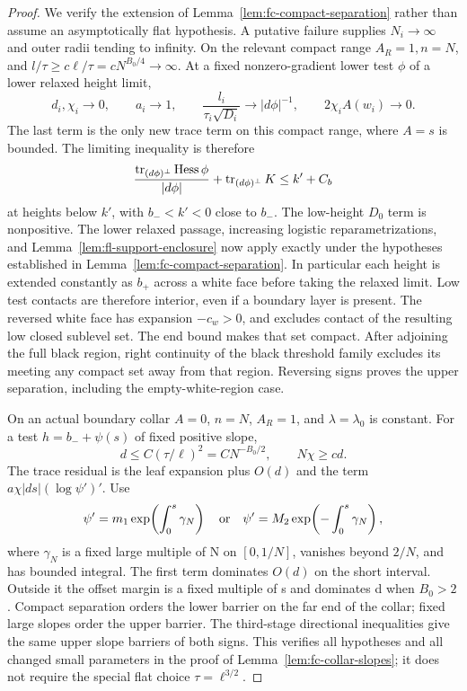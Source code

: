\begin{proof}
We verify the extension of Lemma~\ref{lem:fc-compact-separation}
rather than assume an asymptotically flat hypothesis.  A putative
failure supplies \(N_i\to\infty\) and outer radii tending to infinity.
On the relevant compact range \(A_R=1,n=N\), and
\(l/\tau\ge c\ell/\tau=cN^{B_0/4}\to\infty\).
At a fixed nonzero-gradient lower test \(\phi\) of a lower relaxed
height limit,
\[
 d_i,\chi_i\longrightarrow0,\qquad a_i\longrightarrow1,\qquad
 \frac{l_i}{\tau_i\sqrt{D_i}}\longrightarrow|d\phi|^{-1},
 \qquad 2\chi_iA(w_i)\longrightarrow0.
\]
The last term is the only new trace term on this compact range,
where \(A=s\) is bounded.  The limiting inequality is therefore
\[
 \frac{\operatorname{tr}_{(d\phi)^\perp}\operatorname{Hess}\phi}{|d\phi|}
       +\operatorname{tr}_{(d\phi)^\perp}K\le k'+C_b
\]
at heights below \(k'\), with \(b_-<k'<0\) close to \(b_-\).
The low-height \(D_0\) term is nonpositive.  The lower relaxed passage,
increasing logistic reparametrizations, and
Lemma~\ref{lem:fl-support-enclosure} now apply exactly under the
hypotheses established in Lemma~\ref{lem:fc-compact-separation}.
In particular each height is extended constantly as \(b_+\) across
a white face before taking the relaxed limit.  Low test contacts
are therefore interior, even if a boundary layer is present.
The reversed white face has expansion \(-c_w>0\), and excludes
contact of the resulting low closed sublevel set.  The end bound
makes that set compact.  After adjoining the full black region,
right continuity of the black threshold family excludes its meeting
any compact set away from that region.  Reversing signs proves the
upper separation, including the empty-white-region case.

On an actual boundary collar \(A=0\), \(n=N\), \(A_R=1\), and
\(\lambda=\lambda_0\) is constant.  For a test
\(h=b_-+\psi(s)\) of fixed positive slope,
\[
 d\le C(\tau/\ell)^2=C N^{-B_0/2},
 \qquad N\chi\ge c d.
\]
The trace residual is the leaf expansion plus \(O(d)\) and the
term \(a\chi|ds|(\log\psi')'\).
Use
\[
 \psi'=m_1\exp\!\left(\int_0^s\gamma_N\right)
 \quad\hbox{or}\quad
 \psi'=M_2\exp\!\left(-\int_0^s\gamma_N\right),
\]
where \(\gamma_N\) is a fixed large multiple of N on
\([0,1/N]\), vanishes beyond \(2/N\), and has bounded integral.
The first term dominates \(O(d)\) on the short interval.
Outside it the offset margin is a fixed multiple of s and
dominates d when \(B_0>2\).  Compact separation orders the lower
barrier on the far end of the collar; fixed large slopes order
the upper barrier.  The third-stage directional inequalities
give the same upper slope barriers of both signs.
This verifies all hypotheses and all changed small parameters in
the proof of Lemma~\ref{lem:fc-collar-slopes}; it does not require
the special flat choice \(\tau=\ell^{3/2}\).


\end{proof}

